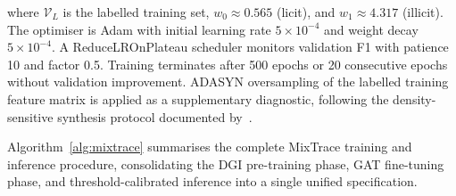 \documentclass[12pt,a4paper]{article}
\begin{document}
where $\mathcal{V}_L$ is the labelled training set,
$w_0 \approx 0.565$ (licit), and $w_1 \approx 4.317$
(illicit). The optimiser is Adam with initial learning
rate $5 \times 10^{-4}$ and weight decay $5 \times 10^{-4}$.
A ReduceLROnPlateau scheduler monitors validation F1
with patience 10 and factor 0.5. Training terminates
after 500 epochs or 20 consecutive epochs without
validation improvement. ADASYN oversampling of the
labelled training feature matrix is applied as a
supplementary diagnostic, following the density-sensitive
synthesis protocol documented by~\citet{tekkali2024}.

Algorithm~\ref{alg:mixtrace} summarises the complete
MixTrace training and inference procedure, consolidating
the DGI pre-training phase, GAT fine-tuning phase, and
threshold-calibrated inference into a single unified
specification.
\end{document}
